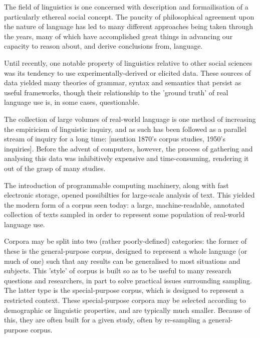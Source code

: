 

The field of linguistics is one concerned with description and formailisation of a particularly ethereal social concept.  The paucity of philosophical agreement upon the nature of language has led to many different approaches being taken through the years, many of which have accomplished great things in advancing our capacity to reason about, and derive conclusions from, language.

Until recently, one notable property of linguistics relative to other social sciences was its tendency to use experimentally-derived or elicited data.  These sources of data yielded many theories of grammar, syntax and semantics that persist as useful frameworks, though their relationship to the 'ground truth' of real language use is, in some cases, questionable.

The collection of large volumes of real-world language is one method of increasing the empiricism of linguistic inquiry, and as such has been followed as a parallel stream of inquiry for a long time: [mention 1870's corpus studies, 1950's inquiries].  Before the advent of computers, however, the process of gathering and analysing this data was inhibitively expensive and time-consuming, rendering it out of the grasp of many studies.

The introduction of programmable computing machinery, along with fast electronic storage, opened possibilties for large-scale analysis of text.  This yielded the modern form of a corpus seen today: a large, machine-readable, annotated collection of texts sampled in order to represent some population of real-world language use.

Corpora may be split into two (rather poorly-defined) categories: the former of these is the general-purpose corpus, designed to represent a whole language (or much of one) such that any results can be generalised to most situations and subjects.  This 'style' of corpus is built so as to be useful to many research questions and researchers, in part to solve practical issues surrounding sampling.  The latter type is the special-purpose corpus, which is designed to represent a restricted context.  These special-purpose corpora may be selected according to demographic or linguistic properties, and are typically much smaller.  Because of this, they are often built for a given study, often by re-sampling a general-purpose corpus.





